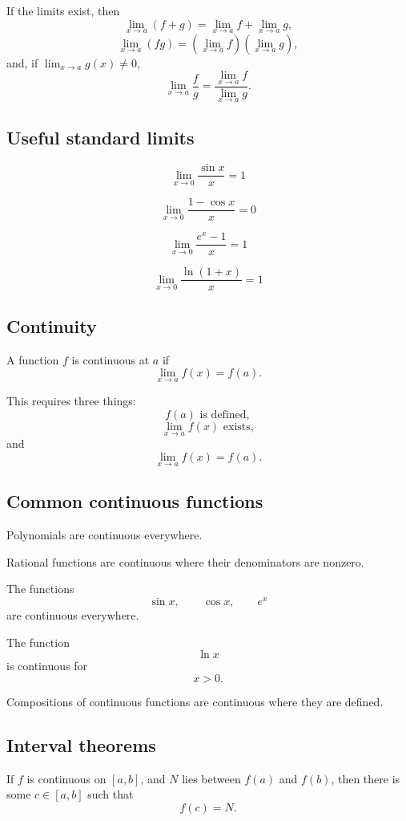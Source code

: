If the limits exist, then
\[
\lim_{x\to a}(f+g)=\lim_{x\to a}f+\lim_{x\to a}g,
\]
\[
\lim_{x\to a}(fg)=
\left(\lim_{x\to a}f\right)
\left(\lim_{x\to a}g\right),
\]
and, if \(\lim_{x\to a}g(x)\ne0\),
\[
\lim_{x\to a}\frac{f}{g}
=
\frac{\lim_{x\to a}f}{\lim_{x\to a}g}.
\]

\subsection*{Useful standard limits}

\[
\boxed{
    \lim_{x\to0}\frac{\sin x}{x}=1
}
\]

\[
\boxed{
    \lim_{x\to0}\frac{1-\cos x}{x}=0
}
\]

\[
\boxed{
    \lim_{x\to0}\frac{e^x-1}{x}=1
}
\]

\[
\boxed{
    \lim_{x\to0}\frac{\ln(1+x)}{x}=1
}
\]

\subsection*{Continuity}

A function \(f\) is continuous at \(a\) if
\[
\boxed{
    \lim_{x\to a}f(x)=f(a).
}
\]

This requires three things:
\[
    f(a)\text{ is defined},
\]
\[
    \lim_{x\to a}f(x)\text{ exists},
\]
and
\[
    \lim_{x\to a}f(x)=f(a).
\]

\subsection*{Common continuous functions}

Polynomials are continuous everywhere.

Rational functions are continuous where their denominators are nonzero.

The functions
\[
    \sin x,\qquad \cos x,\qquad e^x
\]
are continuous everywhere.

The function
\[
    \ln x
\]
is continuous for
\[
    x>0.
\]

Compositions of continuous functions are continuous where they are defined.

\subsection*{Interval theorems}

\begin{theorem}
If \(f\) is continuous on \([a,b]\), and \(N\) lies between \(f(a)\) and \(f(b)\), then
there is some \(c\in[a,b]\) such that
\[
    f(c)=N.
\]
\end{theorem}

